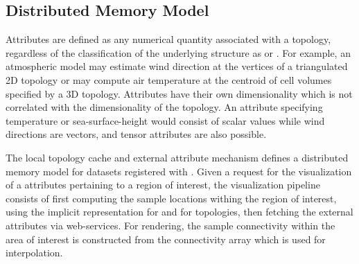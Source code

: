 \subsection{Distributed Memory Model}
Attributes are defined as any numerical quantity associated with a
topology, regardless of the classification of the underlying structure
as \cgrid{} or \ugrid{}. For example, an atmospheric model may
estimate wind direction at the vertices of a triangulated 2D topology
or may compute air temperature at the centroid of cell volumes
specified by a 3D topology. Attributes have their own dimensionality
which is not correlated with the dimensionality of the topology. An
attribute specifying temperature or sea-surface-height would consist
of scalar values while wind directions are vectors, and tensor attributes
are also possible.

The local topology cache and external attribute mechanism defines a
distributed memory model for datasets registered with \sciwms{}. Given
a request for the visualization of a attributes pertaining to a region
of interest, the visualization pipeline consists of first computing
the sample locations withing the region of interest, using the
implicit representation for \cgrid{} and \rtree{} for \ugrid{}
topologies, then fetching the external attributes via \ogc{}
web-services. For rendering, the sample connectivity within the area
of interest is constructed from the connectivity array which is used
for interpolation.

